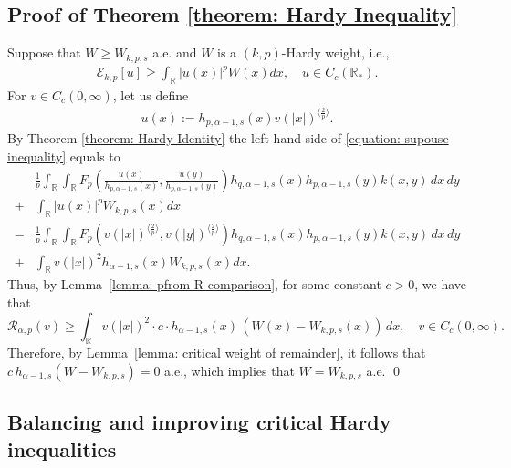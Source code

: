 \documentclass[12pt, a4paper]{amsart}
\newcommand{\R}{\mathbb{R}}
\newcommand{\RR}{\mathcal{R}}
\newcommand{\Ro}{\R_*}
\newcommand{\E}{\mathcal{E}}
\begin{document}
\subsection*{Proof of Theorem \cref{theorem: Hardy Inequality}}
Suppose that $W \geq W_{k, p, s}$ a.e. and $W$ is a $(k, p)$-Hardy weight, i.e.,
\begin{align}
\label{equation: supouse inequality}
    \E_{k, p}[u] \geq \int_{\R}|u(x)|^pW(x)dx, \quad u \in C_c(\Ro).
\end{align}
For $v \in C_c(0, \infty)$, let us define \begin{align}\label{e.da}
    u(x) := h_{p, {\alpha - 1}, s}(x)v(|x|)^{\langle\frac{2}{p}\rangle}. 
\end{align}
By Theorem \cref{theorem: Hardy Identity} the left hand side of \cref{equation: supouse inequality} equals to
\begin{align*}
    &\frac{1}{p}\int_{\R}\int_{\R}F_p \left( \frac{u(x)}{h_{p, \alpha - 1, s}(x)}, \frac{u(y)}{h_{p, \alpha - 1, s}(y)}\right) h_{q, \alpha - 1, s}(x)h_{p, \alpha - 1, s}(y) k(x, y)\,dx\,dy\\ + &\int_{\R}|u(x)|^pW_{k, p, s}(x)dx
    \\
    = &\frac{1}{p}\int_{\R}\int_{\R}F_p \left( v(|x|)^{\langle\frac{2}{p}\rangle}, v(|y|)^{\langle\frac{2}{p}\rangle}\right) h_{q, \alpha - 1, s}(x)h_{p, \alpha - 1, s}(y) k(x, y)\,dx\,dy\\ + &\int_{\R}v(|x|)^2 h_{\alpha-1, s}(x) W_{k, p, s}(x)dx. 
\end{align*}
Thus, by Lemma~\cref{lemma: pfrom R comparison}, for some constant \( c > 0 \), we have that
\[
    \RR_{\alpha, p}(v) \geq \int_{\R} v(|x|)^2 \cdot c\cdot h_{\alpha - 1, s}(x)\, (W(x) - W_{k, p, s}(x))\, dx, \quad v \in C_c(0, \infty).
\]
Therefore, by Lemma~\cref{lemma: critical weight of remainder}, it follows that \( c\, h_{\alpha-1, s}(W - W_{k, p, s}) = 0 \) a.e., which implies that \( W = W_{k, p, s} \) a.e.
\qed
\subsection{Balancing and improving critical Hardy inequalities}
\end{document}
